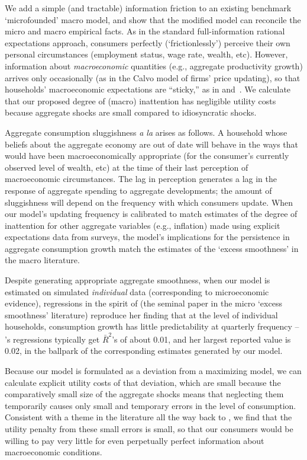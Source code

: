 \documentclass[titlepage]{article}
\begin{document}
We add a simple (and tractable) information friction to an existing benchmark `microfounded' macro model, and show that the modified model can reconcile the micro and macro empirical facts. As in the standard full-information rational expectations approach, consumers perfectly (`frictionlessly') perceive their own personal circumstances (employment status, wage rate, wealth, etc). However, information about \textit{macroeconomic} quantities (e.g., aggregate productivity growth) arrives only occasionally (as in the Calvo model of firms' price updating), so that households' macroeconomic expectations are ``sticky,'' as in \cite{mrSlumps} and~\cite{carroll:epidemicinflQJE}. We calculate that our proposed degree of (macro) inattention has negligible utility costs because aggregate shocks are small compared to idiosyncratic shocks.

Aggregate consumption sluggishness \textit{a la} \cite{cdSmooth} arises as follows.  A household whose beliefs about the aggregate economy are out of date will behave in the ways that would have been macroeconomically appropriate (for the consumer's currently observed level of wealth, etc) at the time of their last perception of macroeconomic circumstances.  The lag in perception generates a lag in the response of aggregate spending to aggregate developments; the amount of sluggishness will depend on the frequency with which consumers update.  When our model's updating frequency is calibrated to match estimates of the degree of inattention for other aggregate variables (e.g., inflation) made using explicit expectations data from surveys, the model's implications for the persistence in aggregate consumption growth match the estimates of the `excess smoothness' in the macro literature. 

Despite generating appropriate aggregate smoothness, when our model is estimated on simulated \emph{individual} data (corresponding to microeconomic evidence), regressions in the spirit of  \cite{dynanHabits} (the seminal paper in the micro `excess smoothness' literature) reproduce her finding that at the level of individual households, consumption growth has little predictability at quarterly frequency -- \cite{dynanHabits}'s regressions typically get $\bar{R}^{2}$'s of about 0.01, and her largest reported value is 0.02, in the ballpark of the corresponding estimates generated by our model.
 
Because our model is formulated as a deviation from a maximizing model, we can calculate explicit utility costs of that deviation, which are small because the comparatively small size of the aggregate shocks means that neglecting them temporarily causes only small and temporary errors in the level of consumption.  Consistent with a theme in the literature all the way back to \cite{ayNearRational}, we find that the utility penalty from these small errors is small, so that our consumers would be willing to pay very little for even perpetually perfect information about macroeconomic conditions.
\end{document}
